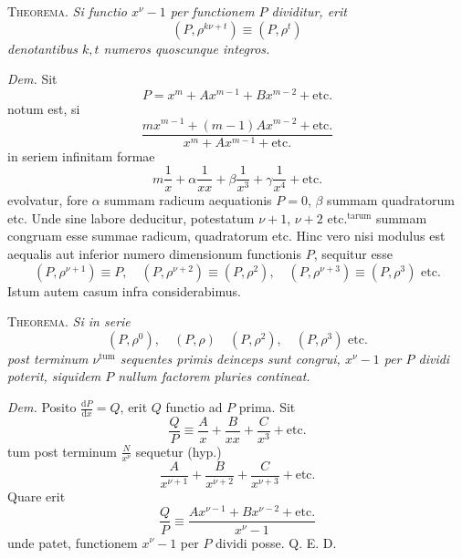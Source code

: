 \textsc{Theorema.} \emph{Si functio $x^\nu-1$ per functionem $P$ dividitur, erit}
\[
(P,\rho^{k\nu+t})\equiv(P,\rho^t)
\]
\emph{denotantibus $k,t$ numeros quoscunque integros.}

\emph{Dem.} Sit
\[
P=x^m+Ax^{m-1}+Bx^{m-2}+\text{etc.}
\]
notum est, si
\[
\frac{mx^{m-1}+(m-1)Ax^{m-2}+\text{etc.}}{x^m+Ax^{m-1}+\text{etc.}}
\]
in seriem infinitam formae
\[
m\frac1x+\alpha\frac1{xx}+\beta\frac1{x^3}+\gamma\frac1{x^4}+\text{etc.}
\]
evolvatur, fore $\alpha$ summam radicum aequationis $P=0$, $\beta$ summam quadratorum etc. Unde sine labore deducitur, potestatum $\nu+1$, $\nu+2$ etc.$^{\mathrm{tarum}}$ summam congruam esse summae radicum, quadratorum etc. Hinc vero nisi modulus est aequalis aut inferior numero dimensionum functionis $P$, sequitur esse
\[
(P,\rho^{\nu+1})\equiv P,\quad(P,\rho^{\nu+2})\equiv(P,\rho^2),\quad(P,\rho^{\nu+3})\equiv(P,\rho^3)\text{ etc.}
\]
Istum autem casum infra considerabimus.

\textsc{Theorema.} \emph{Si in serie}
\[
(P,\rho^0),\quad(P,\rho)\quad(P,\rho^2),\quad(P,\rho^3)\text{ etc.}
\]
\emph{post terminum $\nu^{\mathrm{tum}}$ sequentes primis deinceps sunt congrui, $x^\nu-1$ per $P$ dividi poterit, siquidem $P$ nullum factorem pluries contineat.}

\emph{Dem.} Posito $\frac{\mathrm{d}P}{\mathrm{d}x}=Q$, erit $Q$ functio ad $P$ prima. Sit
\[
\frac QP\equiv\frac Ax+\frac B{xx}+\frac C{x^3}+\text{etc.}
\]
tum post terminum $\frac N{x^\nu}$ sequetur (hyp.)
\[
\frac A{x^{\nu+1}}+\frac B{x^{\nu+2}}+\frac C{x^{\nu+3}}+\text{etc.}
\]
Quare erit
\[
\frac QP\equiv\frac{Ax^{\nu-1}+Bx^{\nu-2}+\text{etc.}}{x^\nu-1}
\]
unde patet, functionem $x^\nu-1$ per $P$ dividi posse. Q. E. D.
